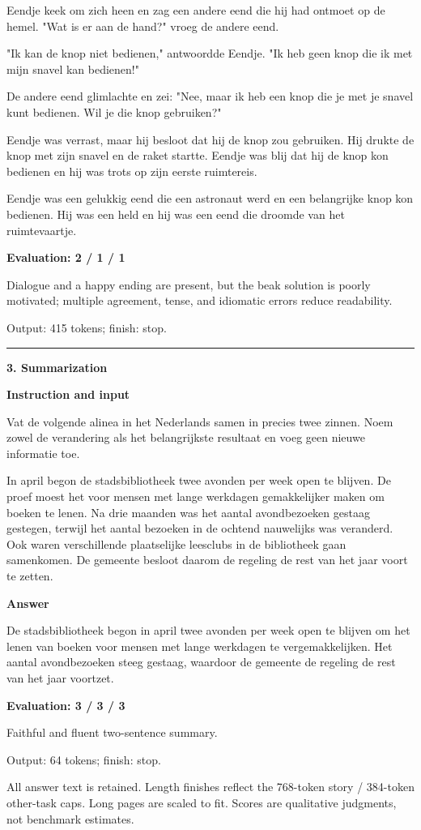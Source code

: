 \documentclass[10pt]{article}
\begin{document}
{\begin{minipage}{\textwidth}
\par\smallskip
Eendje keek om zich heen en zag een andere eend die hij had ontmoet op de hemel. "Wat is er aan de hand?" vroeg de andere eend.
\par\smallskip
"Ik kan de knop niet bedienen," antwoordde Eendje. "Ik heb geen knop die ik met mijn snavel kan bedienen!"
\par\smallskip
De andere eend glimlachte en zei: "Nee, maar ik heb een knop die je met je snavel kunt bedienen. Wil je die knop gebruiken?"
\par\smallskip
Eendje was verrast, maar hij besloot dat hij de knop zou gebruiken. Hij drukte de knop met zijn snavel en de raket startte. Eendje was blij dat hij de knop kon bedienen en hij was trots op zijn eerste ruimtereis.
\par\smallskip
Eendje was een gelukkig eend die een astronaut werd en een belangrijke knop kon bedienen. Hij was een held en hij was een eend die droomde van het ruimtevaartje.\par\smallskip
\textbf{Evaluation: 2 / 1 / 1}\par Dialogue and a happy ending are present, but the beak solution is poorly motivated; multiple agreement, tense, and idiomatic errors reduce readability.
\par {\color{gray} Output: 415 tokens; finish: stop.}\par
\medskip\hrule\smallskip
{\bfseries 3. Summarization}\par\smallskip
\textbf{Instruction and input}\par Vat de volgende alinea in het Nederlands samen in precies twee zinnen. Noem zowel de verandering als het belangrijkste resultaat en voeg geen nieuwe informatie toe.
\par\smallskip
In april begon de stadsbibliotheek twee avonden per week open te blijven. De proef moest het voor mensen met lange werkdagen gemakkelijker maken om boeken te lenen. Na drie maanden was het aantal avondbezoeken gestaag gestegen, terwijl het aantal bezoeken in de ochtend nauwelijks was veranderd. Ook waren verschillende plaatselijke leesclubs in de bibliotheek gaan samenkomen. De gemeente besloot daarom de regeling de rest van het jaar voort te zetten.\par\smallskip
\textbf{Answer}\par De stadsbibliotheek begon in april twee avonden per week open te blijven om het lenen van boeken voor mensen met lange werkdagen te vergemakkelijken. Het aantal avondbezoeken steeg gestaag, waardoor de gemeente de regeling de rest van het jaar voortzet.\par\smallskip
\textbf{Evaluation: 3 / 3 / 3}\par Faithful and fluent two-sentence summary.
\par {\color{gray} Output: 64 tokens; finish: stop.}\par
\medskip\footnotesize All answer text is retained. Length finishes reflect the 768-token story / 384-token other-task caps. Long pages are scaled to fit. Scores are qualitative judgments, not benchmark estimates.
\end{minipage}}%
\end{document}
